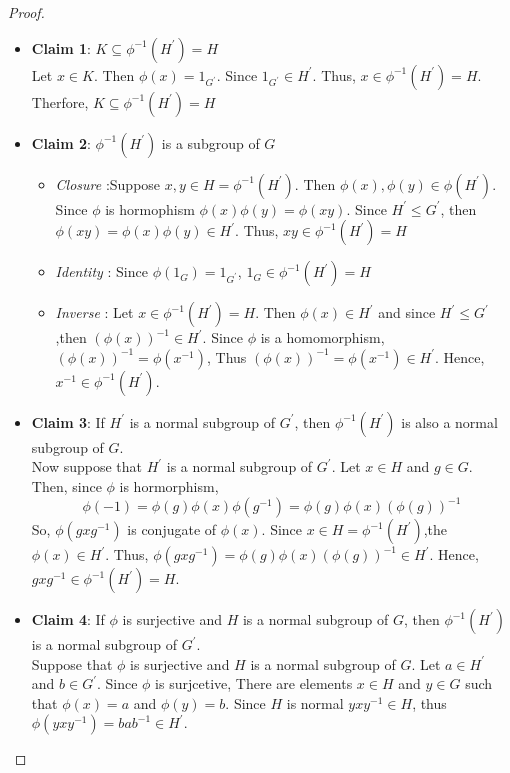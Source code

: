 \documentclass[
]{book}
\providecommand{\tightlist}{%
  \setlength{\itemsep}{0pt}\setlength{\parskip}{0pt}}
\theoremstyle{definition}
\theoremstyle{definition}
\theoremstyle{definition}
\theoremstyle{definition}
\theoremstyle{remark}
\begin{document}
\begin{proof}
\leavevmode

\begin{itemize}
\tightlist
\item
  \textbf{Claim 1}: \(K\subseteq \phi^{-1}(H^\prime)=H\)\\
  Let \(x\in K\). Then \(\phi(x)=1_{G^\prime}\). Since \(1_{G^\prime}\in H^\prime\). Thus, \(x\in \phi^{-1}(H^\prime)=H\). Therfore, \(K\subseteq \phi^{-1}(H^\prime)=H\)
\item
  \textbf{Claim 2}: \(\phi^{-1}(H^\prime)\) is a subgroup of \(G\)\\

  \begin{itemize}
  \tightlist
  \item
    \emph{Closure} :Suppose \(x,y\in H= \phi^{-1}(H^\prime)\). Then \(\phi(x),\phi(y)\in \phi(H^\prime)\). Since \(\phi\) is hormophism \(\phi(x)\phi(y)=\phi(xy)\). Since \(H^\prime\leq G^\prime\), then \(\phi(xy)=\phi(x)\phi(y)\in H^\prime\). Thus, \(xy\in \phi^{-1}(H^\prime)=H\)
  \item
    \emph{Identity} : Since \(\phi(1_G)=1_{G^\prime}\), \(1_G\in \phi^{-1}(H^\prime)=H\)
  \item
    \emph{Inverse} : Let \(x\in \phi^{-1}(H^\prime)=H\). Then \(\phi(x)\in H^\prime\) and since \(H^\prime \leq G^\prime\),then \((\phi(x))^{-1}\in H^\prime\). Since \(\phi\) is a homomorphism, \((\phi(x))^{-1}=\phi(x^{-1})\), Thus \((\phi(x))^{-1}=\phi(x^{-1})\in H^\prime\). Hence, \(x^{-1}\in \phi^{-1}(H^\prime)\).
  \end{itemize}
\item
  \textbf{Claim 3}: If \(H^\prime\) is a normal subgroup of \(G^\prime\), then \(\phi^{-1}(H^\prime)\) is also a normal subgroup of \(G\).\\
  Now suppose that \(H^\prime\) is a normal subgroup of \(G^\prime\). Let \(x\in H\) and \(g\in G\). Then, since \(\phi\) is hormorphism,
  \[\phi(-1)=\phi(g)\phi(x)\phi(g^{-1})=\phi(g)\phi(x)(\phi(g))^{-1}\]
  So, \(\phi(gxg^{-1})\) is conjugate of \(\phi(x)\). Since \(x\in H=\phi^{-1}(H^\prime)\),the \(\phi(x)\in H^\prime\). Thus, \(\phi(gxg^{-1})=\phi(g)\phi(x)(\phi(g))^{-1}\in H^\prime\). Hence,
  \(gxg^{-1}\in \phi^{-1}(H^\prime)=H\).
\item
  \textbf{Claim 4}: If \(\phi\) is surjective and \(H\) is a normal subgroup of \(G\), then \(\phi^{-1}(H^\prime)\) is a normal subgroup of \(G^\prime\).\\
  Suppose that \(\phi\) is surjective and \(H\) is a normal subgroup of \(G\). Let \(a\in H^\prime\) and \(b\in G^\prime\). Since \(\phi\) is surjcetive, There are elements \(x\in H\) and \(y\in G\) such that \(\phi(x) = a\) and \(\phi(y) = b\). Since \(H\) is normal \(yxy^{- 1}\in H\), thus \(\phi(yxy^{-1})=bab^{-1}\in H^\prime\).
\end{itemize}

\end{proof}
\end{document}
